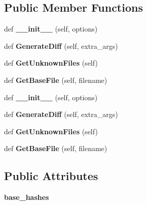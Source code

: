 \subsection*{Public Member Functions}
\begin{DoxyCompactItemize}
\item 
\mbox{\label{classupload_1_1_git_v_c_s_aba4e1dca1c4b3e5db7ba07f6bce3c839}} 
def {\bfseries \+\_\+\+\_\+init\+\_\+\+\_\+} (self, options)
\item 
\mbox{\label{classupload_1_1_git_v_c_s_a3ebfc01cebc9b585706ad3f4389a8833}} 
def {\bfseries Generate\+Diff} (self, extra\+\_\+args)
\item 
\mbox{\label{classupload_1_1_git_v_c_s_ae4e8c0e9fa01619c6a5c76d1ab84b995}} 
def {\bfseries Get\+Unknown\+Files} (self)
\item 
\mbox{\label{classupload_1_1_git_v_c_s_a70ddb65a6b512b8cb8cc4affa37ff9b4}} 
def {\bfseries Get\+Base\+File} (self, filename)
\item 
\mbox{\label{classupload_1_1_git_v_c_s_aba4e1dca1c4b3e5db7ba07f6bce3c839}} 
def {\bfseries \+\_\+\+\_\+init\+\_\+\+\_\+} (self, options)
\item 
\mbox{\label{classupload_1_1_git_v_c_s_a3ebfc01cebc9b585706ad3f4389a8833}} 
def {\bfseries Generate\+Diff} (self, extra\+\_\+args)
\item 
\mbox{\label{classupload_1_1_git_v_c_s_ae4e8c0e9fa01619c6a5c76d1ab84b995}} 
def {\bfseries Get\+Unknown\+Files} (self)
\item 
\mbox{\label{classupload_1_1_git_v_c_s_a70ddb65a6b512b8cb8cc4affa37ff9b4}} 
def {\bfseries Get\+Base\+File} (self, filename)
\end{DoxyCompactItemize}
\subsection*{Public Attributes}
\begin{DoxyCompactItemize}
\item 
\mbox{\label{classupload_1_1_git_v_c_s_a07e9469050a157f34fe804cdf6ecddac}} 
{\bfseries base\+\_\+hashes}
\end{DoxyCompactItemize}


